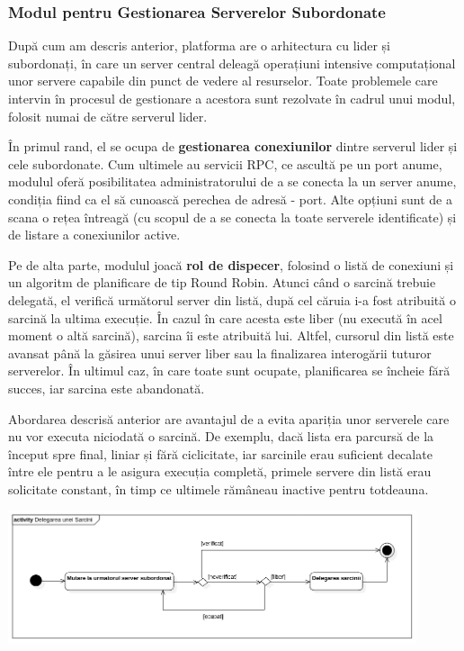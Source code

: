 \documentclass[../../main.tex]{subfiles}
\begin{document}
\subsubsection{Modul pentru Gestionarea Serverelor Subordonate}

După cum am descris anterior, platforma are o arhitectura cu lider și subordo\-nați, în care un server central deleagă operațiuni intensive computațional unor servere capabile din punct de vedere al resurselor. Toate problemele care intervin în procesul de gestionare a acestora sunt rezolvate în cadrul unui modul, folosit numai de către serverul lider.

În primul rand, el se ocupa de \textbf{gestionarea conexiunilor} dintre serverul lider și cele subordonate. Cum ultimele au servicii RPC, ce ascultă pe un port anume, modulul oferă posibilitatea administratorului de a se conecta la un server anume, condiția fiind ca el să cunoască perechea de adresă - port. Alte opțiuni sunt de a scana o rețea întreagă (cu scopul de a se conecta la toate serverele identificate) și de listare a conexiunilor active.

Pe de alta parte, modulul joacă \textbf{rol de dispecer}, folosind o listă de conexiuni și un algoritm de planificare de tip Round Robin. Atunci când o sarcină trebuie delegată, el verifică următorul server din listă, după cel căruia i-a fost atribuită o sarcină la ultima execuție. În cazul în care acesta este liber (nu execută în acel moment o altă sarcină), sarcina îi este atribuită lui. Altfel, cursorul din listă este avansat până la găsirea unui server liber sau la finalizarea interogării tuturor serverelor. În ultimul caz, în care toate sunt ocupate, planificarea se încheie fără succes, iar sarcina este abandonată.

Abordarea descrisă anterior are avantajul de a evita apariția unor serverele care nu vor executa niciodată o sarcină. De exemplu, dacă lista era parcursă de la început spre final, liniar și fără ciclicitate, iar sarcinile erau suficient decalate între ele pentru a le asigura execuția completă, primele servere din listă erau solicitate constant, în timp ce ultimele rămâneau inactive pentru totdeauna.

\begin{center}
    \includegraphics[width=12cm]{components/images/diagrams/activity_diagram_task_delegation.png}
    \label{fig:activity_diagram_task_delegation}
    \captionsetup{justification=centering,margin=1cm}
\end{center}
\vspace{0.3cm}
\end{document}
